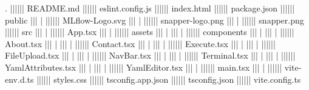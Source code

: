 .
|\TreeBranch||\TreeLine||\TreeLine| README.md
|\TreeBranch||\TreeLine||\TreeLine| eslint.config.js
|\TreeBranch||\TreeLine||\TreeLine| index.html
|\TreeBranch||\TreeLine||\TreeLine| package.json
|\TreeBranch||\TreeLine||\TreeLine| public
|\TreeVert||  | |\TreeBranch||\TreeLine||\TreeLine| MLflow-Logo.svg
|\TreeVert||  | |\TreeBranch||\TreeLine||\TreeLine| snapper-logo.png
|\TreeVert||  | |\TreeEnd||\TreeLine||\TreeLine| snapper.png
|\TreeBranch||\TreeLine||\TreeLine| src
|\TreeVert||  | |\TreeBranch||\TreeLine||\TreeLine| App.tsx
|\TreeVert||  | |\TreeBranch||\TreeLine||\TreeLine| assets
|\TreeVert||  | |\TreeVert||  | |\TreeEnd||\TreeLine||\TreeLine| components
|\TreeVert||  | |\TreeVert||  |     |\TreeBranch||\TreeLine||\TreeLine| About.tsx
|\TreeVert||  | |\TreeVert||  |     |\TreeBranch||\TreeLine||\TreeLine| Contact.tsx
|\TreeVert||  | |\TreeVert||  |     |\TreeBranch||\TreeLine||\TreeLine| Execute.tsx
|\TreeVert||  | |\TreeVert||  |     |\TreeBranch||\TreeLine||\TreeLine| FileUpload.tsx
|\TreeVert||  | |\TreeVert||  |     |\TreeBranch||\TreeLine||\TreeLine| NavBar.tsx
|\TreeVert||  | |\TreeVert||  |     |\TreeBranch||\TreeLine||\TreeLine| Terminal.tsx
|\TreeVert||  | |\TreeVert||  |     |\TreeBranch||\TreeLine||\TreeLine| YamlAttributes.tsx
|\TreeVert||  | |\TreeVert||  |     |\TreeEnd||\TreeLine||\TreeLine| YamlEditor.tsx
|\TreeVert||  | |\TreeBranch||\TreeLine||\TreeLine| main.tsx
|\TreeVert||  | |\TreeEnd||\TreeLine||\TreeLine| vite-env.d.ts
|\TreeBranch||\TreeLine||\TreeLine| styles.css
|\TreeBranch||\TreeLine||\TreeLine| tsconfig.app.json
|\TreeBranch||\TreeLine||\TreeLine| tsconfig.json
|\TreeEnd||\TreeLine||\TreeLine| vite.config.ts